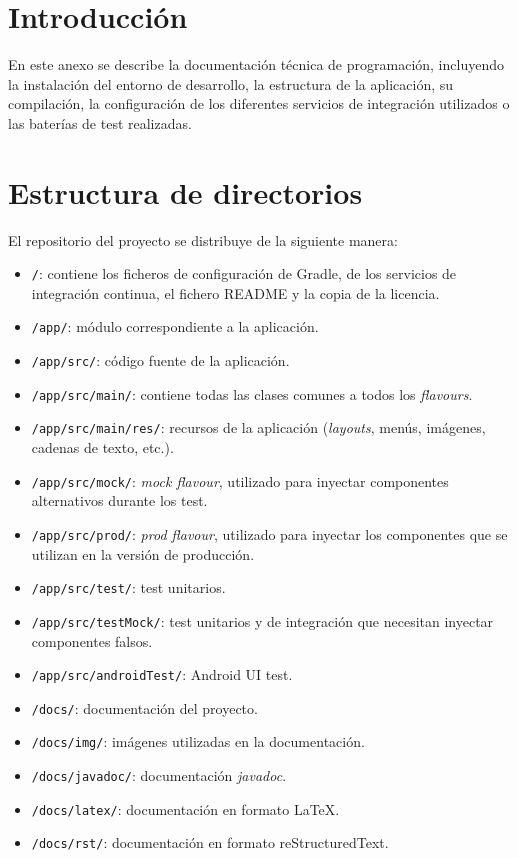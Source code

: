 
\section{Introducción}\label{introduccion}

En este anexo se describe la documentación técnica de programación,
incluyendo la instalación del entorno de desarrollo, la estructura de la
aplicación, su compilación, la configuración de los diferentes servicios
de integración utilizados o las baterías de test realizadas.

\section{Estructura de directorios}\label{estructura-de-directorios}

El repositorio del proyecto se distribuye de la siguiente manera:

\begin{itemize}
\tightlist
\item
  \texttt{/}: contiene los ficheros de configuración de Gradle, de los
  servicios de integración continua, el fichero README y la copia de la
  licencia.
\item
  \texttt{/app/}: módulo correspondiente a la aplicación.
\item
  \texttt{/app/src/}: código fuente de la aplicación.
\item
  \texttt{/app/src/main/}: contiene todas las clases comunes a todos los
  \emph{flavours}.
\item
  \texttt{/app/src/main/res/}: recursos de la aplicación
  (\emph{layouts}, menús, imágenes, cadenas de texto, etc.).
\item
  \texttt{/app/src/mock/}: \emph{mock flavour}, utilizado para inyectar
  componentes alternativos durante los test.
\item
  \texttt{/app/src/prod/}: \emph{prod flavour}, utilizado para inyectar
  los componentes que se utilizan en la versión de producción.
\item
  \texttt{/app/src/test/}: test unitarios.
\item
  \texttt{/app/src/testMock/}: test unitarios y de integración que
  necesitan inyectar componentes falsos.
\item
  \texttt{/app/src/androidTest/}: Android UI test.
\item
  \texttt{/docs/}: documentación del proyecto.
\item
  \texttt{/docs/img/}: imágenes utilizadas en la documentación.
\item
  \texttt{/docs/javadoc/}: documentación \emph{javadoc}.
\item
  \texttt{/docs/latex/}: documentación en formato \LaTeX.
\item
  \texttt{/docs/rst/}: documentación en formato reStructuredText.
\end{itemize}

